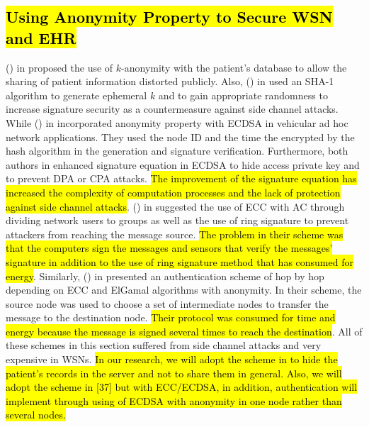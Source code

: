 \documentclass[a4paper,11pt]{article}
\DeclareRobustCommand{\hlyellow}[1]{{\sethlcolor{white}\hl{#1}}}
\begin{document}
\subsection{\hlyellow{Using Anonymity Property to Secure WSN and EHR}}
\citeauthor{pr22}(\citeyear{pr22}) in \cite{pr22} proposed the use of $k$-anonymity with the patient's database to allow the sharing of patient information distorted publicly. Also, \citeauthor{p78}(\citeyear{p78}) in \cite{p78} used an SHA-1 algorithm to generate ephemeral $k$ and to gain appropriate randomness to increase signature security as a countermeasure against side channel attacks. While \citeauthor{pr23}(\citeyear{pr23}) in \cite{pr23} incorporated anonymity property with ECDSA in vehicular ad hoc network applications. They used the node ID and the time the encrypted by the hash algorithm in the generation and signature verification. Furthermore, both authors in \cite{p78,p27} enhanced signature equation in ECDSA to hide access private key and to prevent DPA or CPA attacks. \hlyellow{The improvement of the signature equation has increased the complexity of computation processes and 
the lack of protection against side channel attacks}. \citeauthor{pr34}(\citeyear{pr34}) in \cite{pr34} suggested the use of ECC with AC through dividing network users to groups as well as the use of ring signature to prevent attackers from reaching the message source. \hlyellow{The problem in their scheme was that the computers sign the messages and sensors that verify the messages' signature in addition to the use of ring signature method that has consumed for energy}. Similarly, \citeauthor{pr33}(\citeyear{pr33}) in \cite{pr33} presented an authentication scheme of hop by hop depending on ECC and ElGamal algorithms with anonymity. In their scheme, the source node was used to choose a set of intermediate nodes to transfer the message to the destination node. \hlyellow{Their protocol was consumed for time and energy because the message is signed several times to reach the destination}. All of these schemes in this section suffered from side channel attacks and very expensive in WSNs. \hlyellow{In our research, we will adopt the scheme in \cite{pr22} to hide the patient's records in the server and not to share them in general. Also, we will adopt the scheme in [37] but with ECC/ECDSA, in addition, authentication will implement through using of ECDSA with anonymity in one node rather than several nodes.}
\end{document}
